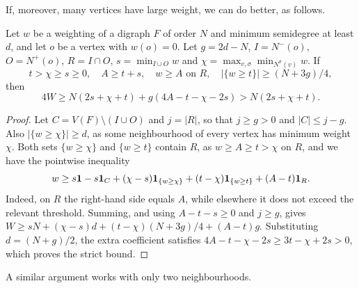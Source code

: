 If, moreover, many vertices have large weight, we can do better, as follows.

\begin{lemma}
\label{boundary391:counts:2}\label{prefixlayer:count}
Let $w$ be a weighting of a digraph $F$ of order $N$ and minimum semidegree
at least $d$, and let $o$ be a vertex with $w(o)=0$. Let $g=2d-N$,
$I=N^-(o)$, $O=N^+(o)$, $R=I\cap O$,
$s=\min_{I\cup O}w$ and
$\chi=\max_{v,\sigma}\min_{N^\sigma(v)}w$.
If
\begin{equation}\label{prefixlayer:count-hyp}
 t>\chi\ge s\ge0,\quad A\ge t+s,\quad w\ge A\text{ on }R,
 \quad |\{w\ge t\}|\ge(N+3g)/4,
\end{equation}
then
\begin{equation}\label{prefixlayer:count-bound}
 4W\ge N(2s+\chi+t)+g(4A-t-\chi-2s)>N(2s+\chi+t).
\end{equation}
\end{lemma}
\begin{proof}
Let $C=V(F)\setminus(I\cup O)$ and $j=|R|$, so that
$j\ge g>0$ and $|C|\le j-g$. Also $|\{w\ge\chi\}|\ge d$, as some neighbourhood of every vertex has minimum weight $\chi$.
Both sets $\{w\ge\chi\}$ and $\{w\ge t\}$ contain $R$, as $w\ge A\ge t>\chi$ on $R$, and we have the pointwise inequality
\[
 w\ge s\boldsymbol1-s\mathbf 1_C
 +(\chi-s)\mathbf 1_{\{w\ge\chi\}}
 +(t-\chi)\mathbf 1_{\{w\ge t\}}+(A-t)\mathbf 1_R.
\]
Indeed, on $R$ the right-hand side equals $A$, while elsewhere it does not exceed
the relevant threshold. Summing, and using $A-t-s\ge0$ and $j\ge g$, gives $W\ge sN+(\chi-s)d+(t-\chi)(N+3g)/4+(A-t)g$. Substituting $d=(N+g)/2$, the extra coefficient satisfies
$4A-t-\chi-2s\ge3t-\chi+2s>0$, which proves the strict bound.
\end{proof}

A similar argument works with only two neighbourhoods.

